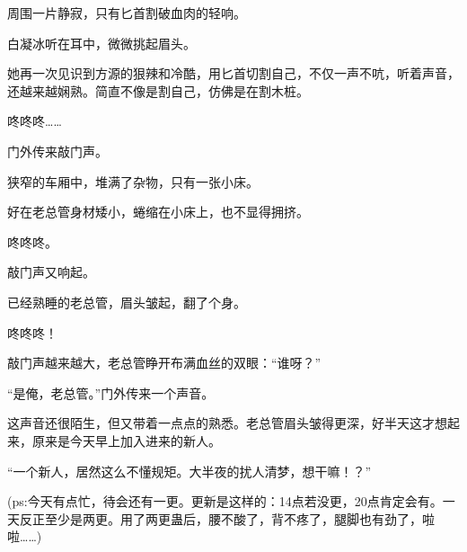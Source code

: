 \begin{this_body}
周围一片静寂，只有匕首割破血肉的轻响。

白凝冰听在耳中，微微挑起眉头。

她再一次见识到方源的狠辣和冷酷，用匕首切割自己，不仅一声不吭，听着声音，还越来越娴熟。简直不像是割自己，仿佛是在割木桩。

咚咚咚……

门外传来敲门声。

狭窄的车厢中，堆满了杂物，只有一张小床。

好在老总管身材矮小，蜷缩在小床上，也不显得拥挤。

咚咚咚。

敲门声又响起。

已经熟睡的老总管，眉头皱起，翻了个身。

咚咚咚！

敲门声越来越大，老总管睁开布满血丝的双眼：“谁呀？”

“是俺，老总管。”门外传来一个声音。

这声音还很陌生，但又带着一点点的熟悉。老总管眉头皱得更深，好半天这才想起来，原来是今天早上加入进来的新人。

“一个新人，居然这么不懂规矩。大半夜的扰人清梦，想干嘛！？”

(ps:今天有点忙，待会还有一更。更新是这样的：14点若没更，20点肯定会有。一天反正至少是两更。用了两更蛊后，腰不酸了，背不疼了，腿脚也有劲了，啦啦……)

\end{this_body}

